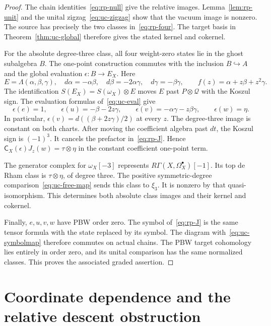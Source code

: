 \begin{proof}
The chain identities~\eqref{eq:rp-null} give the relative images.
Lemma~\ref{lem:rp-unit} and the unital zigzag~\eqref{eq:uc-zigzag} show that the vacuum image is nonzero.
The source has precisely the two classes in~\eqref{eq:rp-four}.
The target basis in Theorem~\ref{thm:uc-global} therefore gives the stated kernel and cokernel.

For the absolute degree-three class, all four weight-zero states lie in the ghost subalgebra $B$.
The one-point construction commutes with the inclusion $B\hookrightarrow A$ and the global evaluation $\epsilon:B\to E_X$.
Here
\[
 E=\Lambda(\alpha,\beta,\gamma),\quad
 d\alpha=-\alpha\beta,\quad d\beta=-2\alpha\gamma,\quad d\gamma=-\beta\gamma,
 \qquad f(z)=\alpha+z\beta+z^2\gamma.
\]
The identification $S(E_X)=S(\omega_X)\otimes E$ moves $E$ past $P\otimes\mathcal Q$ with the Koszul sign.
The evaluation formulas of~\eqref{eq:uc-eval} give
\begin{equation}\label{eq:rp-Eimages}
 \epsilon(e)=1,\qquad
 \epsilon(u)=-\beta-2z\gamma,\qquad
 \epsilon(v)=-\alpha\gamma-z\beta\gamma,\qquad
 \epsilon(w)=\eta.
\end{equation}
In particular, $\epsilon(v)=d((\beta+2z\gamma)/2)$ at every $z$.
The degree-three image is constant on both charts.
After moving the coefficient algebra past $dt$, the Koszul sign is $(-1)^3$.
It cancels the prefactor in~\eqref{eq:rp-J}.
Hence $\mathsf C_X(\epsilon)J_z(w)=\tau\otimes\eta$ in the constant coefficient one-point term.

The generator complex for $\omega_X[-3]$ represents $R\Gamma(X,\Omega_X^\bullet)[-1]$.
Its top de Rham class is $\tau\otimes\eta$, of degree three.
The positive symmetric-degree comparison~\eqref{eq:uc-free-map} sends this class to $\xi_3$.
It is nonzero by that quasi-isomorphism.
This determines both absolute class images and their kernel and cokernel.

Finally, $e,u,v,w$ have PBW order zero.
The symbol of~\eqref{eq:rp-J} is the same tensor formula with the state replaced by its symbol.
The diagram with~\eqref{eq:uc-symbolmap} therefore commutes on actual chains.
The PBW target cohomology lies entirely in order zero, and its unital comparison has the same normalized classes.
This proves the associated graded assertion.
\end{proof}

\section{Coordinate dependence and the relative descent obstruction}

